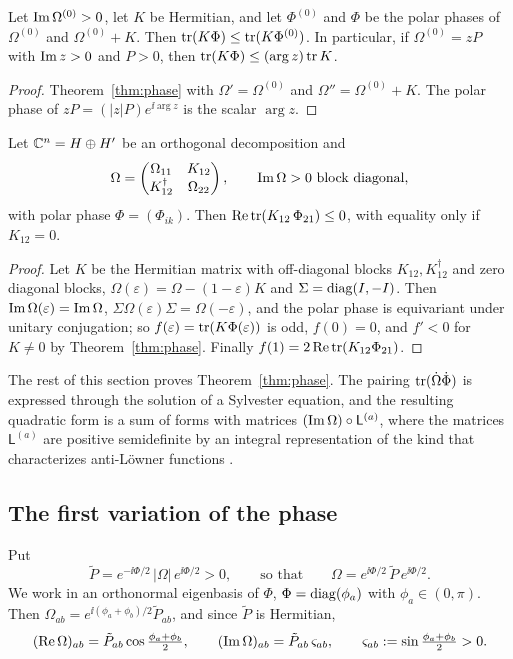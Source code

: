 \begin{corollary}\label{cor:comparison}
Let $\operatorname{Im}\Omega^{(0)}>0$, let $K$ be Hermitian, and let $\Phi^{(0)}$ and $\Phi$
be the polar phases of $\Omega^{(0)}$ and $\Omega^{(0)}+K$. Then
$\operatorname{tr}(K\Phi)\leq\operatorname{tr}(K\Phi^{(0)})$. In particular, if
$\Omega^{(0)}=zP$ with $\operatorname{Im} z>0$ and $P>0$, then
$\operatorname{tr}(K\Phi)\leq(\arg z)\operatorname{tr} K$.
\end{corollary}

\begin{proof}
Theorem~\ref{thm:phase} with $\Omega'=\Omega^{(0)}$ and
$\Omega''=\Omega^{(0)}+K$. The polar phase of $zP=(|z|P)e^{\ii\arg z}$ is the
scalar $\arg z$.
\end{proof}

\begin{corollary}\label{cor:blocks}
Let $\mathbb C^n=H\oplus H'$ be an orthogonal decomposition and
\[
 \Omega=\begin{pmatrix}\Omega_{11}&K_{12}\\K_{12}^\dagger&\Omega_{22}\end{pmatrix},
 \qquad\operatorname{Im}\Omega>0\text{ block diagonal},
\]
with polar phase $\Phi=(\Phi_{ik})$. Then
$\operatorname{Re}\operatorname{tr}(K_{12}\,\Phi_{21})\leq0$, with equality only if $K_{12}=0$.
\end{corollary}

\begin{proof}
Let $K$ be the Hermitian matrix with off-diagonal blocks $K_{12},K_{12}^\dagger$
and zero diagonal blocks, $\Omega(\varepsilon)=\Omega-(1-\varepsilon)K$ and
$\Sigma=\operatorname{diag}(I,-I)$. Then $\operatorname{Im}\Omega(\varepsilon)=\operatorname{Im}\Omega$,
$\Sigma\Omega(\varepsilon)\Sigma=\Omega(-\varepsilon)$, and the polar phase is
equivariant under unitary conjugation; so
$f(\varepsilon)=\operatorname{tr}(K\Phi(\varepsilon))$ is odd, $f(0)=0$, and $f'<0$ for
$K\neq0$ by Theorem~\ref{thm:phase}. Finally
$f(1)=2\operatorname{Re}\operatorname{tr}(K_{12}\Phi_{21})$.
\end{proof}

The rest of this section proves Theorem~\ref{thm:phase}. The pairing
$\operatorname{tr}(\dot\Omega\dot\Phi)$ is expressed through the solution of a Sylvester
equation, and the resulting quadratic form is a sum of forms with matrices
$(\operatorname{Im}\Omega)\circ\mathsf L^{(a)}$, where the matrices $\mathsf L^{(a)}$ are
positive semidefinite by an integral representation of the kind that
characterizes anti-L\"owner functions \cite{aud11}.

\subsection{The first variation of the phase}
Put
\[
 \tilde P=e^{-\ii\Phi/2}\,|\Omega|\,e^{\ii\Phi/2}>0,\qquad\text{so that}\qquad
 \Omega=e^{\ii\Phi/2}\,\tilde P\,e^{\ii\Phi/2}.
\]
We work in an orthonormal eigenbasis of $\Phi$, $\Phi=\operatorname{diag}(\phi_a)$ with
$\phi_a\in(0,\pi)$. Then
$\Omega_{ab}=e^{\ii(\phi_a+\phi_b)/2}\tilde P_{ab}$, and since $\tilde P$ is
Hermitian,
\begin{equation}\label{eq:reim}
 (\operatorname{Re}\Omega)_{ab}=\tilde P_{ab}\cos\tfrac{\phi_a+\phi_b}2,\qquad
 (\operatorname{Im}\Omega)_{ab}=\tilde P_{ab}\,\varsigma_{ab},\qquad
 \varsigma_{ab}:=\sin\tfrac{\phi_a+\phi_b}2>0 .
\end{equation}

